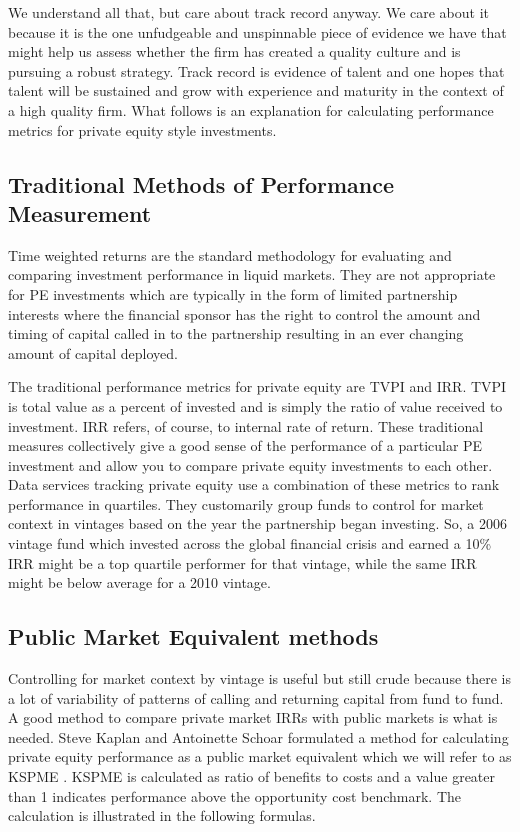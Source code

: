 \documentclass[12pt,english]{article}\usepackage[]{graphicx}\usepackage[]{color}
\begin{document}
We understand all that, but care about track record anyway. We care
about it because it is the one unfudgeable and unspinnable piece of
evidence we have that might help us assess whether the firm has created
a quality culture and is pursuing a robust strategy. Track record
is evidence of talent and one hopes that talent will be sustained
and grow with experience and maturity in the context of a high quality
firm. What follows is an explanation for calculating performance metrics
for private equity style investments.



\subsection*{Traditional Methods of Performance Measurement}

Time weighted returns are the standard methodology for evaluating
and comparing investment performance in liquid markets. They are not
appropriate for PE investments which are typically in the form of
limited partnership interests where the financial sponsor has the
right to control the amount and timing of capital called in to the
partnership resulting in an ever changing amount of capital deployed. 

The traditional performance metrics for private equity are TVPI and
IRR. TVPI is \textquotedbl total value as a percent of invested\textquotedbl{}
and is simply the ratio of value received to investment. IRR refers,
of course, to internal rate of return. These traditional measures
collectively give a good sense of the performance of a particular
PE investment and allow you to compare private equity investments
to each other. Data services tracking private equity use a combination
of these metrics to rank performance in \textquotedbl quartiles\textquotedbl .
They customarily group funds to control for market context in \textquotedbl vintages\textquotedbl{}
based on the year the partnership began investing. So, a 2006 vintage
fund which invested across the global financial crisis and earned
a 10\% IRR might be a top quartile performer for that vintage, while
the same IRR might be below average for a 2010 vintage.

\subsection*{Public Market Equivalent methods }

Controlling for market context by vintage is useful but still crude
because there is a lot of variability of patterns of calling and returning
capital from fund to fund. A good method to compare private market
IRRs with public markets is what is needed. Steve Kaplan and Antoinette
Schoar formulated a method for calculating private equity performance
as a \textquotedbl public market equivalent\textquotedbl{} which
we will refer to as KSPME \parencite{Kaplan2005}. KSPME is calculated
as ratio of benefits to costs and a value greater than 1 indicates
performance above the opportunity cost benchmark. The calculation
is illustrated in the following formulas.
\end{document}
